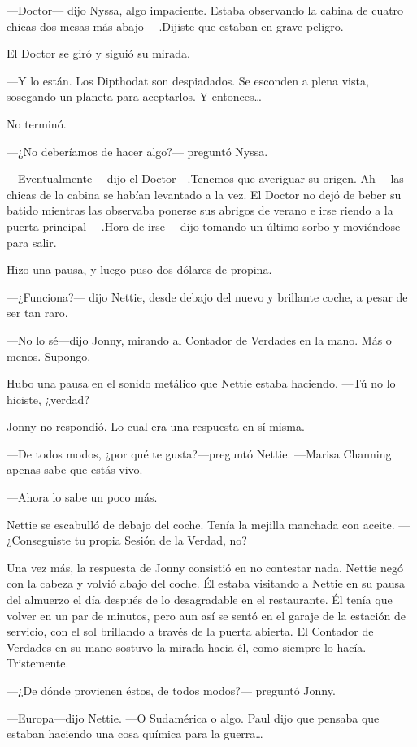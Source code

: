 ---Doctor--- dijo Nyssa, algo impaciente. Estaba observando la cabina de
cuatro chicas dos mesas más abajo ---.Dijiste que estaban en grave
peligro.

El Doctor se giró y siguió su mirada.

---Y lo están. Los Dipthodat son despiadados. Se esconden a plena vista,
sosegando un planeta para aceptarlos. Y entonces\ldots{}

No terminó.

---¿No deberíamos de hacer algo?--- preguntó Nyssa.

---Eventualmente--- dijo el Doctor---.Tenemos que averiguar su origen.
Ah--- las chicas de la cabina se habían levantado a la vez. El Doctor no
dejó de beber su batido mientras las observaba ponerse sus abrigos de
verano e irse riendo a la puerta principal ---.Hora de irse--- dijo
tomando un último sorbo y moviéndose para salir.

Hizo una pausa, y luego puso dos dólares de propina.

---¿Funciona?--- dijo Nettie, desde debajo del nuevo y brillante coche,
a pesar de ser tan raro.

---No lo sé---dijo Jonny, mirando al Contador de Verdades en la mano.
Más o menos. Supongo.

Hubo una pausa en el sonido metálico que Nettie estaba haciendo. ---Tú
no lo hiciste, ¿verdad?

Jonny no respondió. Lo cual era una respuesta en sí misma.

---De todos modos, ¿por qué te gusta?---preguntó Nettie. ---Marisa
Channing apenas sabe que estás vivo.

---Ahora lo sabe un poco más.

Nettie se escabulló de debajo del coche. Tenía la mejilla manchada con
aceite. ---¿Conseguiste tu propia Sesión de la Verdad, no?

Una vez más, la respuesta de Jonny consistió en no contestar nada.
Nettie negó con la cabeza y volvió abajo del coche. Él estaba visitando
a Nettie en su pausa del almuerzo el día después de lo desagradable en
el restaurante. Él tenía que volver en un par de minutos, pero aun así
se sentó en el garaje de la estación de servicio, con el sol brillando a
través de la puerta abierta. El Contador de Verdades en su mano sostuvo
la mirada hacia él, como siempre lo hacía. Tristemente.

---¿De dónde provienen éstos, de todos modos?--- preguntó Jonny.

---Europa---dijo Nettie. ---O Sudamérica o algo. Paul dijo que pensaba
que estaban haciendo una cosa química para la guerra\ldots{}


